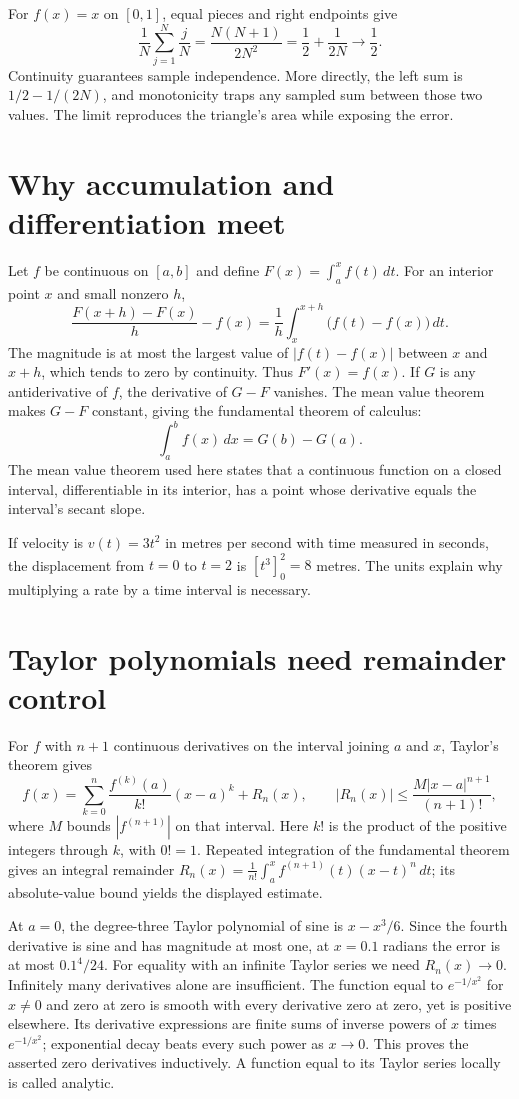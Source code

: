 For $f(x)=x$ on $[0,1]$, equal pieces and right endpoints give
\[
 \frac1N\sum_{j=1}^N\frac jN
 =\frac{N(N+1)}{2N^2}=\frac12+\frac1{2N}\longrightarrow\frac12.
\]
Continuity guarantees sample independence. More directly, the left sum is
$1/2-1/(2N)$, and monotonicity traps any sampled sum between those two
values. The limit reproduces the triangle's area while exposing the error.

\section{Why accumulation and differentiation meet}
Let $f$ be continuous on $[a,b]$ and define
$F(x)=\int_a^x f(t)\,dt$. For an interior point $x$ and small nonzero $h$,
\[
 \frac{F(x+h)-F(x)}h-f(x)
 =\frac1h\int_x^{x+h}\bigl(f(t)-f(x)\bigr)\,dt.
\]
The magnitude is at most the largest value of $|f(t)-f(x)|$ between
$x$ and $x+h$, which tends to zero by continuity. Thus $F'(x)=f(x)$.
If $G$ is any antiderivative of $f$, the derivative of $G-F$ vanishes.
The mean value theorem makes $G-F$ constant, giving the fundamental theorem
of calculus:
\[
 \int_a^b f(x)\,dx=G(b)-G(a).
\]
The mean value theorem used here states that a continuous function on a
closed interval, differentiable in its interior, has a point whose derivative
equals the interval's secant slope.

If velocity is $v(t)=3t^2$ in metres per second with time measured in seconds,
the displacement from $t=0$ to $t=2$ is $[t^3]_0^2=8$ metres.
The units explain why multiplying a rate by a time interval is necessary.

\section{Taylor polynomials need remainder control}
For $f$ with $n+1$ continuous derivatives on the interval joining $a$ and $x$,
Taylor's theorem gives
\[
 f(x)=\sum_{k=0}^n\frac{f^{(k)}(a)}{k!}(x-a)^k+R_n(x),\qquad
 |R_n(x)|\leq\frac{M|x-a|^{n+1}}{(n+1)!},
\]
where $M$ bounds $|f^{(n+1)}|$ on that interval. Here $k!$ is the
product of the positive integers through $k$, with $0!=1$.
Repeated integration of the fundamental theorem gives an integral remainder
$R_n(x)=\frac1{n!}\int_a^x f^{(n+1)}(t)(x-t)^n\,dt$;
its absolute-value bound yields the displayed estimate.

At $a=0$, the degree-three Taylor polynomial of sine is $x-x^3/6$.
Since the fourth derivative is sine and has magnitude at most one, at
$x=0.1$ radians the error is at most $0.1^4/24$.
For equality with an infinite Taylor series we need $R_n(x)\to0$.
Infinitely many derivatives alone are insufficient. The function equal to
$e^{-1/x^2}$ for $x\ne0$ and zero at zero is smooth with every derivative
zero at zero, yet is positive elsewhere. Its derivative expressions are
finite sums of inverse powers of $x$ times $e^{-1/x^2}$; exponential decay
beats every such power as $x\to0$. This proves the asserted zero derivatives
inductively. A function equal to its Taylor series locally is called analytic.

